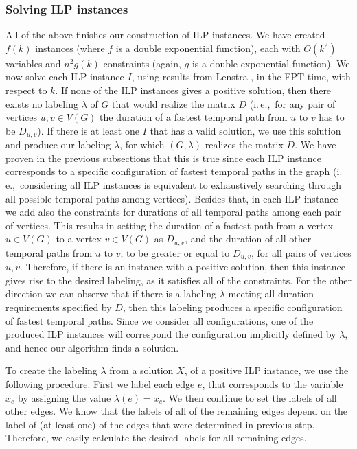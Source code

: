 \documentclass[a4paper,UKenglish,cleveref, autoref, thm-restate]{lipics-v2021}
\newcommand{\ie}{i.\,e.,\ }
\begin{document}
\subsubsection{Solving ILP instances}
All of the above finishes our construction of ILP instances.
We have created $f(k)$ instances (where $f$ is a double exponential function), 
each with $O(k^2)$ variables and $n^2 g(k)$ constraints (again, $g$ is a double exponential function).
We now solve each ILP instance $I$, using results from Lenstra \cite{Lenstra1983Integer},
in the FPT time, with respect to $k$.
%
If none of the ILP instances gives a positive solution, then there exists no labeling $\lambda$ of $G$ that would realize the matrix $D$ (\ie for any pair of vertices $u,v \in V(G)$ the duration of a fastest temporal path from $u$ to $v$ has to be $D_{u,v}$).
If there is at least one $I$ that has a valid solution, 
we use this solution and produce our labeling $\lambda$, for which $(G,\lambda)$ realizes the matrix $D$.
We have proven in the previous subsections that this is true since each ILP instance corresponds to a specific configuration of fastest temporal paths in the graph (\ie considering all ILP instances is equivalent to exhaustively searching through all possible temporal paths among vertices).
Besides that, in each ILP instance we add also the constraints for durations of all temporal paths among each pair of vertices.
This results in setting the duration of a fastest path from a vertex $u \in V(G)$ to a vertex $v \in V(G)$ as $D_{u,v}$,
and the duration of all other temporal paths from $u$ to $v$, to be greater or equal to $D_{u,v}$,
for all pairs of vertices $u,v$.
Therefore, if there is an instance with a positive solution, then this instance gives rise to the desired labeling, as it satisfies all of the constraints.
For the other direction we can observe that if there is a labeling $\lambda$ meeting all duration requirements specified by $D$, then this labeling produces a specific configuration of fastest temporal paths. Since we consider all configurations, one of the produced ILP instances will correspond the configuration implicitly defined by $\lambda$, and hence our algorithm finds a solution.

To create the labeling $\lambda$ from a solution $X$, of a positive ILP instance,
we use the following procedure.
First we
label each edge $e$, that corresponds to the variable $x_e$
by assigning the value $\lambda(e) = x_e$.
We then continue to set the labels of all other edges. 
We know that the labels of all of the remaining edges depend on the label of (at least one) of the edges that were determined in previous step. 
Therefore, we easily calculate the desired labels for all remaining edges.
\end{document}
